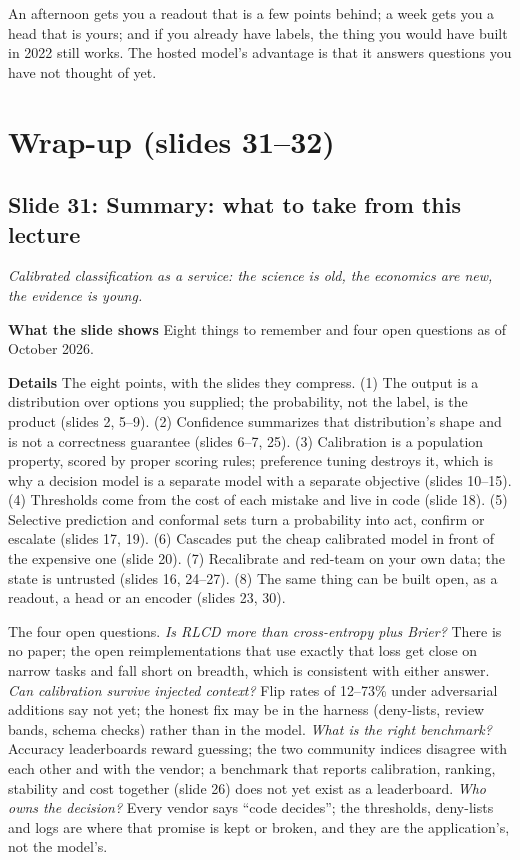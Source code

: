 \documentclass[11pt,letterpaper]{article}
\newcommand{\setstage}[1]{\colorlet{stagec}{#1}}
\newcommand{\slide}[3]{%
  \subsection[Slide #1: #2]{Slide #1: #2}%
  {\color{muted}\itshape #3\par}\medskip}
\newcommand{\para}[1]{\medskip\noindent\textbf{#1}\quad}
\newenvironment{intuition}{\begin{tcolorbox}[intuitionbox]}{\end{tcolorbox}}
\begin{document}
\begin{intuition}
An afternoon gets you a readout that is a few points behind; a week gets you a head that is yours; and if you already have labels, the thing you would have built in 2022 still works. The hosted model's advantage is that it answers questions you have not thought of yet.
\end{intuition}

\setstage{ink}
\section{Wrap-up (slides 31--32)}

\slide{31}{Summary: what to take from this lecture}{Calibrated classification as a service: the science is old, the economics are new, the evidence is young.}

\para{What the slide shows} Eight things to remember and four open questions as of October 2026.

\para{Details} The eight points, with the slides they compress. (1) The output is a distribution over options you supplied; the probability, not the label, is the product (slides 2, 5--9). (2) Confidence summarizes that distribution's shape and is not a correctness guarantee (slides 6--7, 25). (3) Calibration is a population property, scored by proper scoring rules; preference tuning destroys it, which is why a decision model is a separate model with a separate objective (slides 10--15). (4) Thresholds come from the cost of each mistake and live in code (slide 18). (5) Selective prediction and conformal sets turn a probability into act, confirm or escalate (slides 17, 19). (6) Cascades put the cheap calibrated model in front of the expensive one (slide 20). (7) Recalibrate and red-team on your own data; the state is untrusted (slides 16, 24--27). (8) The same thing can be built open, as a readout, a head or an encoder (slides 23, 30).

The four open questions. \emph{Is RLCD more than cross-entropy plus Brier?} There is no paper; the open reimplementations that use exactly that loss get close on narrow tasks and fall short on breadth, which is consistent with either answer. \emph{Can calibration survive injected context?} Flip rates of 12--73\% under adversarial additions say not yet; the honest fix may be in the harness (deny-lists, review bands, schema checks) rather than in the model. \emph{What is the right benchmark?} Accuracy leaderboards reward guessing; the two community indices disagree with each other and with the vendor; a benchmark that reports calibration, ranking, stability and cost together (slide 26) does not yet exist as a leaderboard. \emph{Who owns the decision?} Every vendor says ``code decides''; the thresholds, deny-lists and logs are where that promise is kept or broken, and they are the application's, not the model's.
\end{document}
